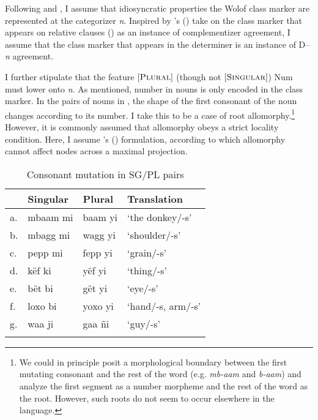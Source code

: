\documentclass[output=paper]{langscibook}
\begin{document}
\noindent   Following \citet{kihm2005noun} and \citet{acquaviva2009roots}, I assume that idiosyncratic properties the Wolof class marker are represented at the categorizer \textit{n}. Inspired by \citeauthor{torrence2013clause}'s (\citeyear{torrence2013clause}) take on the class marker that appears on relative clauses () as an instance of complementizer agreement, I assume that the class marker that appears in the determiner is an instance of D--\textit{n} agreement.
		
I further stipulate that the feature $[\textsc{Plural}]$ (though not $[\textsc{Singular}]$) Num must lower onto \textit{n}. As mentioned, number in nouns is only encoded in the class marker. In the pairs of nouns in , the shape of the first consonant of the noun changes according to its number. I take this to be a case of root allomorphy.\footnote{We could in principle posit a morphological boundary between the first mutating consonant and the rest of the word (e.g. \textit{mb-aam} and \textit{b-aam}) and analyze the first segment as a number morpheme and the rest of the word as the root. However, such roots do not seem to occur elsewhere in the language.} However, it is commonly assumed that allomorphy obeys a strict locality condition. Here, I assume \citeauthor{bobaljik2012universals}'s (\citeyear{bobaljik2012universals}) formulation, according to which allomorphy cannot affect nodes across a maximal projection.
				
				\begin{table}
				\caption{Consonant mutation in SG/PL pairs \citep{loporcaroBabou16}}
				\label{fon:pLSgGGaAWaA}
				\begin{tabular}{llll}
				    \lsptoprule
						& Singular & Plural & Translation\\
						\midrule
						a. & mbaam mi & baam yi & `the donkey/-s'\\
						b. & mbagg mi & wagg yi & `shoulder/-s'\\
						c. & pepp mi & fepp yi & `grain/-s'\\
						d. & këf ki & yëf yi & `thing/-s'\\
						e. & bët bi & gët yi & `eye/-s'\\
						f. & loxo bi & yoxo yi & `hand/-s, arm/-s'\\
						g. & waa ji & gaa ñi & `guy/-s'\\
					\lspbottomrule
				\end{tabular}
				\end{table}
\end{document}
